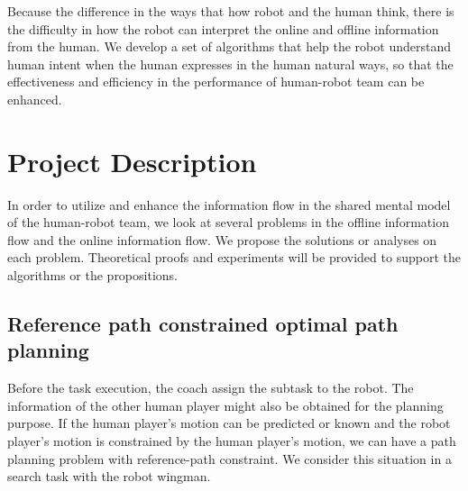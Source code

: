 \documentclass[phd]{byuprop}
\begin{document}

Because the difference in the ways that how robot and the human think, there is the difficulty in how the robot can interpret the online and offline information from the human.
We develop a set of algorithms that help the robot understand human intent when the human expresses in the human natural ways, so that the effectiveness and efficiency in the performance of human-robot team can be enhanced.

\section{Project Description}

In order to utilize and enhance the information flow in the shared mental model of the human-robot team, we look at several problems in the offline information flow and the online information flow.
We propose the solutions or analyses on each problem.
Theoretical proofs and experiments will be provided to support the algorithms or the propositions.

\subsection{Reference path constrained optimal path planning}

Before the task execution, the coach assign the subtask to the robot.
The information of the other human player might also be obtained for the planning purpose.
If the human player's motion can be predicted or known and the robot player's motion is constrained by the human player's motion, we can have a path planning problem with reference-path constraint.
We consider this situation in a search task with the robot wingman.
\end{document}
